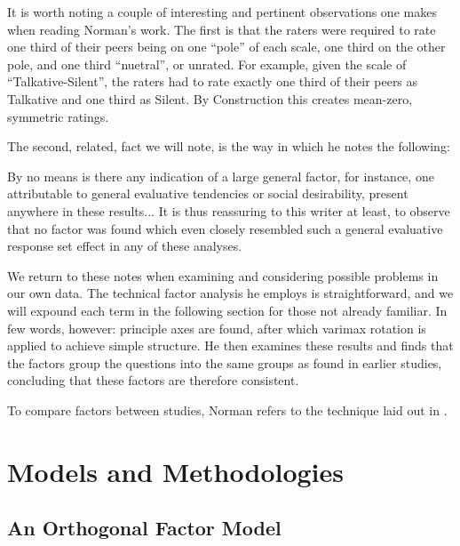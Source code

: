 \documentclass[a4paper,12pt]{article}
\begin{document}
It is worth noting a couple of interesting and pertinent observations one makes when reading Norman's work. The first is that the raters were required to rate one third of their peers being on one ``pole'' of each scale, one third on the other pole, and one third ``nuetral'', or unrated. For example, given the scale of ``Talkative-Silent'', the raters had to rate exactly one third of their peers as Talkative and one third as Silent. By Construction this creates mean-zero, symmetric ratings.

The second, related, fact we will note, is the way in which he notes the following:

\begin{displayquote}
By no means is there any indication of a large general factor, for instance, one attributable to general evaluative tendencies or social desirability, present anywhere in these results... It is thus reassuring to this writer at least, to observe that no factor was found which even closely resembled such a general evaluative response set effect in any of these analyses.
\end{displayquote}

We return to these notes when examining and considering possible problems in our own data. The technical factor analysis he employs is straightforward, and we will expound each term in the following section for those not already familiar. In few words, however: principle axes are found, after which varimax rotation is applied to achieve simple structure. He then examines these results and finds that the factors group the questions into the same groups as found in earlier studies, concluding that these factors are therefore consistent.

To compare factors between studies, Norman refers to the technique laid out in \cite{kaiser1971}.

\section{Models and Methodologies}

\newcommand{\X}{$\mathbf{X} \ $}
\newcommand{\F}{$\mathbf{F} \ $}
\newcommand{\Load}{$\mathbf{L} \ $}
\newcommand{\B}{\mathbf}

\subsection{An Orthogonal Factor Model}
\end{document}
